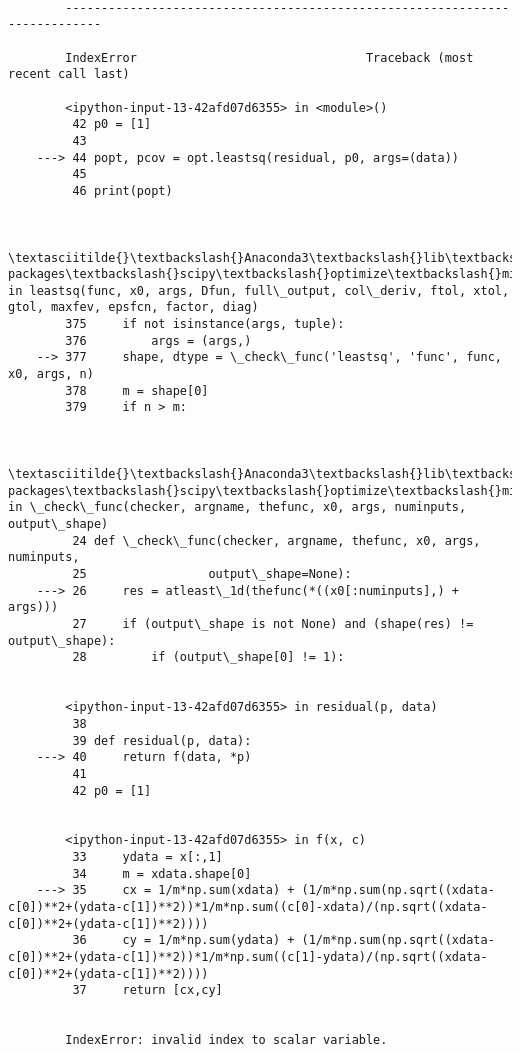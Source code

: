 \documentclass[11pt]{article}
\begin{document}
    \begin{Verbatim}[commandchars=\\\{\}]

        ---------------------------------------------------------------------------

        IndexError                                Traceback (most recent call last)

        <ipython-input-13-42afd07d6355> in <module>()
         42 p0 = [1]
         43 
    ---> 44 popt, pcov = opt.leastsq(residual, p0, args=(data))
         45 
         46 print(popt)
    

        \textasciitilde{}\textbackslash{}Anaconda3\textbackslash{}lib\textbackslash{}site-packages\textbackslash{}scipy\textbackslash{}optimize\textbackslash{}minpack.py in leastsq(func, x0, args, Dfun, full\_output, col\_deriv, ftol, xtol, gtol, maxfev, epsfcn, factor, diag)
        375     if not isinstance(args, tuple):
        376         args = (args,)
    --> 377     shape, dtype = \_check\_func('leastsq', 'func', func, x0, args, n)
        378     m = shape[0]
        379     if n > m:
    

        \textasciitilde{}\textbackslash{}Anaconda3\textbackslash{}lib\textbackslash{}site-packages\textbackslash{}scipy\textbackslash{}optimize\textbackslash{}minpack.py in \_check\_func(checker, argname, thefunc, x0, args, numinputs, output\_shape)
         24 def \_check\_func(checker, argname, thefunc, x0, args, numinputs,
         25                 output\_shape=None):
    ---> 26     res = atleast\_1d(thefunc(*((x0[:numinputs],) + args)))
         27     if (output\_shape is not None) and (shape(res) != output\_shape):
         28         if (output\_shape[0] != 1):
    

        <ipython-input-13-42afd07d6355> in residual(p, data)
         38 
         39 def residual(p, data):
    ---> 40     return f(data, *p)
         41 
         42 p0 = [1]
    

        <ipython-input-13-42afd07d6355> in f(x, c)
         33     ydata = x[:,1]
         34     m = xdata.shape[0]
    ---> 35     cx = 1/m*np.sum(xdata) + (1/m*np.sum(np.sqrt((xdata-c[0])**2+(ydata-c[1])**2))*1/m*np.sum((c[0]-xdata)/(np.sqrt((xdata-c[0])**2+(ydata-c[1])**2))))
         36     cy = 1/m*np.sum(ydata) + (1/m*np.sum(np.sqrt((xdata-c[0])**2+(ydata-c[1])**2))*1/m*np.sum((c[1]-ydata)/(np.sqrt((xdata-c[0])**2+(ydata-c[1])**2))))
         37     return [cx,cy]
    

        IndexError: invalid index to scalar variable.

    \end{Verbatim}


    
    
    
    
\end{document}
